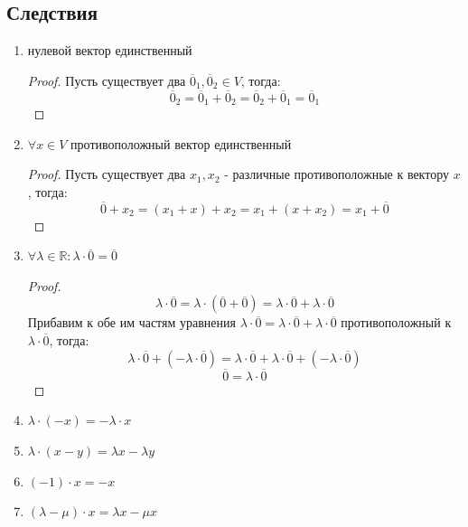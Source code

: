 \documentclass[a4paper, 12pt]{article}
\newcommand{\R}{\mathbb R}
\theoremstyle{definition}
\begin{document}
  \subsection{Следствия}
  \begin{enumerate}
    \item нулевой вектор единственный
    \begin{proof}
      Пусть существует два $\overline{0}_1,\overline{0}_2 \in V$, тогда: $$\overline{0}_2 = \overline{0}_1 + \overline{0}_2 = \overline{0}_2 + \overline{0}_1 = \overline{0}_1$$   
    \end{proof} 
    \item $\forall x \in V$ противоположный вектор единственный
    \begin{proof}
      Пусть существует два $x_1,x_2$ - различные противоположные к вектору $x$, тогда:
      $$\overline{0} + x_2 = (x_1 + x) + x_2 = x_1 + (x + x_2) = x_1 + \overline{0}$$    
    \end{proof} 
    \item $\forall \lambda \in \R: \lambda \cdot \overline{0} = \overline{0}$ 
      \begin{proof}
      $$\lambda \cdot \overline{0} = \lambda \cdot (\overline{0}+\overline{0}) = \lambda \cdot \overline{0} + \lambda \cdot \overline{0}$$ Прибавим к обе им частям уравнения $\lambda \cdot \overline{0} = \lambda \cdot \overline{0} + \lambda \cdot \overline{0}$  противоположный к $\lambda \cdot \overline{0}$, тогда: $$\lambda \cdot \overline{0} + (-\lambda \cdot \overline{0})= \lambda \cdot \overline{0} + \lambda \cdot \overline{0} + (-\lambda \cdot \overline{0})$$ $$\overline{0} = \lambda \cdot \overline{0}$$ 
      \end{proof} 
    \item $\lambda \cdot (-x) = -\lambda \cdot x$
    \item $\lambda \cdot (x-y) = \lambda x - \lambda y$ 
    \item $(-1) \cdot x = -x$
    \item $(\lambda - \mu)\cdot x = \lambda x - \mu x$  
  \end{enumerate}
\end{document}
